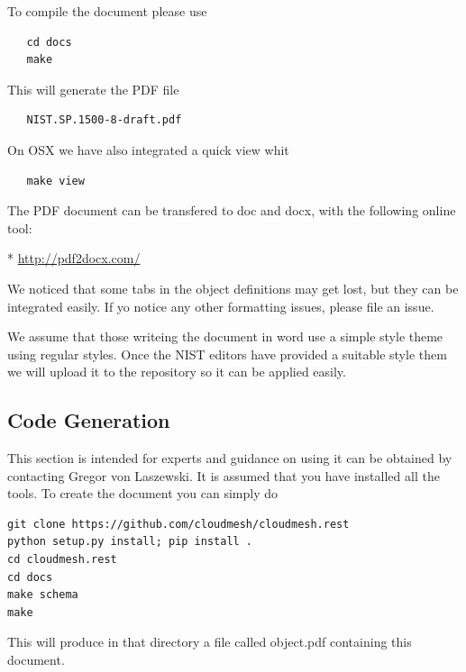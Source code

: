 \documentclass[10pt]{article}
\begin{document}
To compile the document please use 

\begin{verbatim}
   cd docs
   make
\end{verbatim}

This will generate the PDF file 

\begin{verbatim}
   NIST.SP.1500-8-draft.pdf
\end{verbatim}

On OSX we have also integrated a quick view whit 

\begin{verbatim}
   make view
\end{verbatim}

The PDF document can be transfered to doc and docx, with the following
online tool:

* \url{http://pdf2docx.com/}

We noticed that some tabs in the object definitions may get lost, but
they can be integrated easily. If yo notice any other formatting
issues, please file an issue.

We assume that those writeing the document in word use a simple style
theme using regular styles. Once the NIST editors have provided a
suitable style them we will upload it to the repository so it can be
applied easily.

\subsection{Code Generation}

This section is intended for experts and guidance on using it can be
obtained by contacting Gregor von Laszewski. It is assumed that you
have installed all the tools. To create the document you can simply do

\begin{Verbatim}
git clone https://github.com/cloudmesh/cloudmesh.rest
python setup.py install; pip install .
cd cloudmesh.rest
cd docs
make schema
make
\end{Verbatim}

This will produce in that directory a file called object.pdf
containing this document. 
\end{document}
